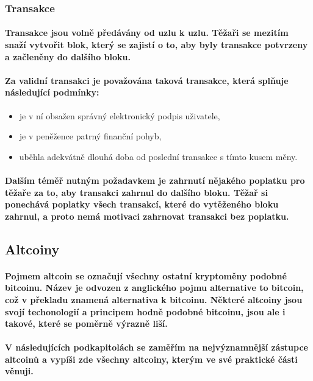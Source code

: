 \documentclass[thesis=B,czech]{FITthesis}[2019/03/21]
\begin{document}
\subsubsection{Transakce}
\paragraph{
Transakce jsou volně předávány od uzlu k uzlu. Těžaři se mezitím snaží vytvořit blok, který se zajistí o to, aby byly transakce potvrzeny a začleněny do dalšího bloku.
}
\paragraph{
Za validní transakci je považována taková transakce, která splňuje následující podmínky:
}
\begin{itemize}
    \item je v ní obsažen správný elektronický podpis uživatele,
    \item je v peněžence patrný finanční pohyb,
    \item uběhla adekvátně dlouhá doba od poslední transakce s tímto kusem měny. \cite{Finex_blockchain}
\end{itemize}
\paragraph{
Dalším téměř nutným požadavkem je zahrnutí nějakého poplatku pro těžaře za to, aby transakci zahrnul do dalšího bloku. Těžař si ponechává poplatky všech transakcí, které do vytěženého bloku zahrnul, a proto nemá motivaci zahrnovat transakci bez poplatku. \cite{Finex_blockchain}
}

\subsection{Altcoiny}
\paragraph{
Pojmem altcoin se označují všechny ostatní kryptoměny podobné bitcoinu. Název je odvozen z anglického pojmu alternative to bitcoin, což v překladu znamená alternativa k bitcoinu. Některé altcoiny jsou svojí techonologií a principem hodně podobné bitcoinu, jsou ale i takové, které se poměrně výrazně liší. \cite{altcoin}
}
\paragraph{
V následujících podkapitolách se zaměřím na nejvýznamnější zástupce altcoinů a vypíši zde všechny altcoiny, kterým ve své praktické části věnuji.
}
\end{document}
